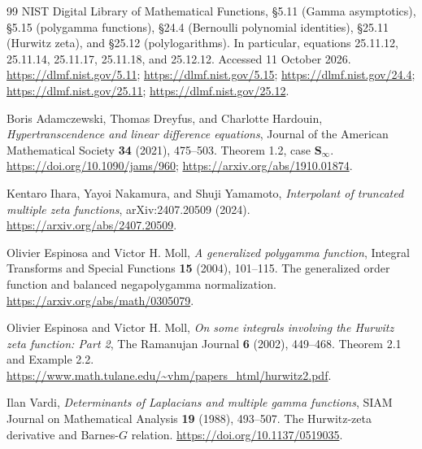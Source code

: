 \documentclass[11pt,a4paper]{article}
\numberwithin{equation}{section}
\theoremstyle{definition}
\theoremstyle{remark}
\begin{document}
\begin{thebibliography}{99}
NIST Digital Library of Mathematical Functions,
\S5.11 (Gamma asymptotics), \S5.15 (polygamma functions),
\S24.4 (Bernoulli polynomial identities),
\S25.11 (Hurwitz zeta), and \S25.12 (polylogarithms).
In particular, equations 25.11.12, 25.11.14, 25.11.17,
25.11.18, and 25.12.12. Accessed 11 October 2026.
\url{https://dlmf.nist.gov/5.11};
\url{https://dlmf.nist.gov/5.15};
\url{https://dlmf.nist.gov/24.4};
\url{https://dlmf.nist.gov/25.11};
\url{https://dlmf.nist.gov/25.12}.

Boris Adamczewski, Thomas Dreyfus, and Charlotte Hardouin,
\emph{Hypertranscendence and linear difference equations},
Journal of the American Mathematical Society \textbf{34} (2021),
475--503. Theorem 1.2, case $\mathbf S_\infty$.
\url{https://doi.org/10.1090/jams/960};
\url{https://arxiv.org/abs/1910.01874}.

Kentaro Ihara, Yayoi Nakamura, and Shuji Yamamoto,
\emph{Interpolant of truncated multiple zeta functions},
arXiv:2407.20509 (2024).
\url{https://arxiv.org/abs/2407.20509}.

Olivier Espinosa and Victor H. Moll,
\emph{A generalized polygamma function},
Integral Transforms and Special Functions \textbf{15} (2004),
101--115. The generalized order function and balanced
negapolygamma normalization.
\url{https://arxiv.org/abs/math/0305079}.

Olivier Espinosa and Victor H. Moll,
\emph{On some integrals involving the Hurwitz zeta function: Part 2},
The Ramanujan Journal \textbf{6} (2002), 449--468.
Theorem 2.1 and Example 2.2.
\url{https://www.math.tulane.edu/~vhm/papers_html/hurwitz2.pdf}.

Ilan Vardi,
\emph{Determinants of Laplacians and multiple gamma functions},
SIAM Journal on Mathematical Analysis \textbf{19} (1988),
493--507. The Hurwitz-zeta derivative and Barnes-$G$ relation.
\url{https://doi.org/10.1137/0519035}.


\end{thebibliography}
\endgroup
\end{document}
